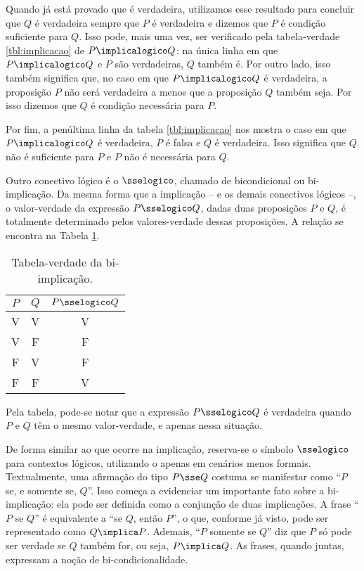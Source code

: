 Quando já está provado que  é verdadeira, utilizamos esse resultado para concluir que $Q$ é verdadeira sempre que $P$ é verdadeira e dizemos que $P$ é condição suficiente para  $Q$. Isso pode, mais uma vez, ser verificado pela tabela-verdade \ref{tbl:implicacao} de $P \implicalogico Q$: na única linha em que $P \implicalogico Q$ e $P$ são verdadeiras, $Q$ também é. Por outro lado, isso também significa que, no caso em que $P \implicalogico Q$ é verdadeira, a proposição $P$ não será verdadeira a menos que a proposição $Q$ também seja. Por isso dizemos que $Q$ é condição necessária para $P$.

Por fim, a penúltima linha da tabela \ref{tbl:implicacao} nos mostra o caso em que $P \implicalogico Q$ é verdadeira, $P$ é falsa e $Q$ é verdadeira. Isso significa que $Q$ não é suficiente para $P$ e $P$ não é necessária para $Q$. 

Outro conectivo lógico é o $\sselogico$, chamado de bicondicional ou bi-implicação.
Da mesma forma que a implicação -- e os demais conectivos lógicos --, o valor-verdade da expressão $P \sselogico Q$, dadas duas proposições $P$ e $Q$, é totalmente determinado pelos valores-verdade dessas proposições.
A relação se encontra na Tabela \ref{tbl:bi-implicacao}.

\begin{table}[h]
	\centering
	\begin{tabular}{cc|c}
		$P$		& $Q$		& $P \sselogico Q$	\\ \hline
		V		& V			& V			\\
		V		& F			& F			\\
		F		& V			& F			\\
		F		& F			& V			\\	
	\end{tabular}
	\caption{Tabela-verdade da bi-implicação.}
	\label{tbl:bi-implicacao}
\end{table}

Pela tabela, pode-se notar que a expressão $P \sselogico Q$ é verdadeira quando $P$ e $Q$ têm o mesmo valor-verdade, e apenas nessa situação.

De forma similar ao que ocorre na implicação, reserva-se o símbolo $\sselogico$ para contextos lógicos, utilizando o \entreaspas{$\sse$} apenas em cenários menos formais. Textualmente, uma afirmação do tipo $P \sse Q$ costuma se manifestar como ``$P$ se, e somente se, $Q$''. Isso começa a evidenciar um importante fato sobre a bi-implicação: ela pode ser definida como a conjunção de duas implicações. A frase ``$P$ se $Q$'' é equivalente a ``se $Q$, então $P$'', o que, conforme já visto, pode ser representado como $Q \implica P$. Ademais, ``$P$ somente se $Q$'' diz que $P$ só pode ser verdade se $Q$ também for, ou seja, $P \implica Q$. As frases, quando juntas, expressam a noção de bi-condicionalidade.

